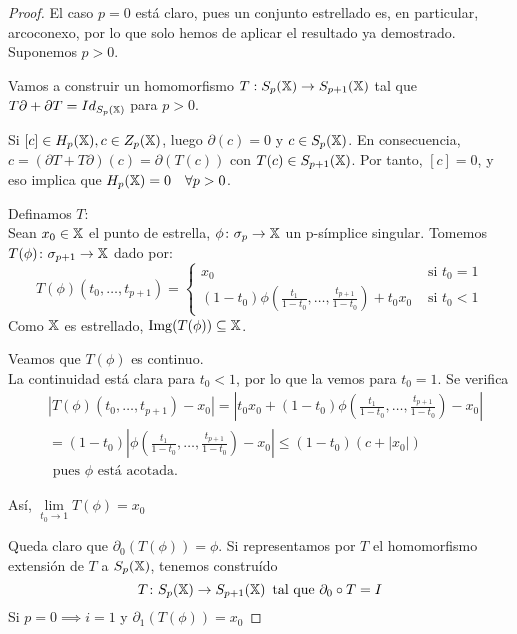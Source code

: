 \begin{proof}
  El caso $p = 0$ está claro, pues un conjunto estrellado es, en particular, arcoconexo, por lo que solo hemos de aplicar el resultado ya demostrado.
  Suponemos $p > 0$.

  Vamos a construir un homomorfismo $ T: S_{p}({\mathbb X}) \to S_{p+1}({\mathbb X})$ tal que $ T \partial + \partial  T = Id_{S_{p}({\mathbb X})}$ para $p > 0$.

  Si $[c] \in H_p({\mathbb X}), c \in Z_p({\mathbb X})$, luego $\partial(c) = 0$ y $c \in S_p({\mathbb X})$. En consecuencia, $c = (\partial  T +  T \partial)(c)
  = \partial( T(c))$ con $ T(c) \in S_{p+1}({\mathbb X})$. Por tanto, $[c] = 0$, y eso implica que $H_p({\mathbb X}) = 0 \quad \forall p > 0$.

  Definamos $ T$: \\
  Sean $x_0 \in {\mathbb X}$ el punto de estrella, $\phi \colon \sigma_p \to {\mathbb X}$ un p-símplice singular. Tomemos $T(\phi) \colon \sigma_{p+1} \to {\mathbb X}$ dado por:
  \[ T(\phi)(t_0,\dots,t_{p+1}) = \begin{cases} x_0 & \text{ si } t_0 = 1 \\
                                                (1-t_0)\phi(\frac{t_1}{1-t_0},\dots,\frac{t_{p+1}}{1-t_0}) + t_0 x_0 & \text{ si } t_0 < 1
                                  \end{cases} \]
  Como ${\mathbb X}$ es estrellado, $\operatorname{Img}(T(\phi)) \subseteq {\mathbb X}$.

  Veamos que $T(\phi)$ es continuo. \\
  La continuidad está clara para $t_0 < 1$, por lo que la vemos para $t_0 = 1$. Se verifica
  \begin{align*}
    &|T(\phi)(t_0,\dots,t_{p+1}) - x_0| = |t_0 x_0 + (1-t_0)\phi(\frac{t_1}{1-t_0},\dots,\frac{t_{p+1}}{1-t_0}) - x_0| \\
    &= (1-t_0)|\phi(\frac{t_1}{1-t_0},\dots,\frac{t_{p+1}}{1-t_0}) - x_0| \leq (1-t_0)(c + |x_0|) \\
    & \text{ pues $\phi$ está acotada.}
  \end{align*}

  Así, $\lim\limits_{t_0 \to 1} T(\phi) = x_0$

  Queda claro que $\partial_0(T(\phi)) = \phi$. Si representamos por $ T$ el homomorfismo extensión de $T$ a $S_{p}({\mathbb X})$, tenemos construído
  \[  T \colon S_{p}({\mathbb X}) \to S_{p+1}({\mathbb X}) \hspace{0.5em} \text{tal que } \partial_0 \circ  T = I \]
  Si $p = 0 \implies i = 1$ y $\partial_1( T(\phi)) = x_0$


\end{proof}
